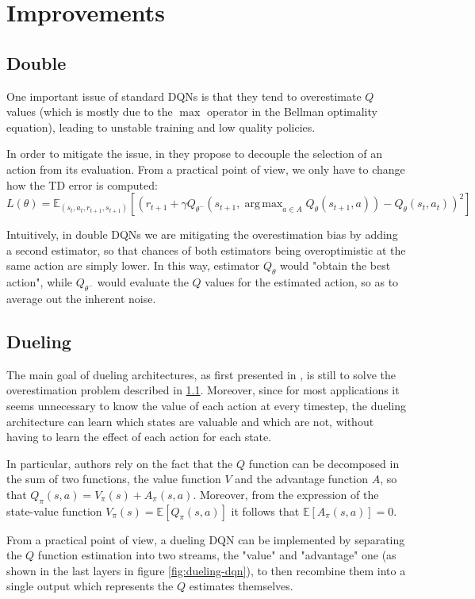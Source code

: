 \documentclass[a4paper,10pt]{report}
\DeclareMathOperator*{\argmax}{arg\,max}
\begin{document}
\section{Improvements}
\subsection{Double}\label{subsec:double-dqn}
One important issue of standard DQNs is that they tend to overestimate $Q$ values (which is mostly due to the $\max$ operator in the Bellman optimality equation), leading to unstable training and low quality policies. 

In order to mitigate the issue, in \cite{double-dqn} they propose to decouple the selection of an action from its evaluation. From a practical point of view, we only have to change how the TD error is computed:
$$
L(\theta)=\mathbb{E}_{(s_t,a_t,r_{t+1},s_{t+1})}\left[\left(r_{t+1}+\gamma Q_{\theta^-}(s_{t+1},\argmax_{a \in A}Q_\theta(s_{t+1},a)) - Q_{\theta}(s_t, a_t)\right)^2\right]
$$

Intuitively, in double DQNs we are mitigating the overestimation bias by adding a second estimator, so that chances of both estimators being overoptimistic at the same action are simply lower. In this way, estimator $Q_{\theta}$ would "obtain the best action", while $Q_{\theta^-}$ would evaluate the $Q$ values for the estimated action, so as to average out the inherent noise.

\subsection{Dueling}\label{subsec:dueling-dqn}
The main goal of dueling architectures, as first presented in \cite{dueling-dqn}, is still to solve the overestimation problem described in \ref{subsec:double-dqn}. Moreover, since for most applications it seems unnecessary to know the value of each action at every timestep, the dueling architecture can learn which states are valuable and which are not, without having to learn the effect of each action for each state.

In particular, authors rely on the fact that the $Q$ function can be decomposed in the sum of two functions, the value function $V$ and the advantage function $A$, so that $Q_\pi(s,a)=V_\pi(s)+A_\pi(s,a)$. Moreover, from the expression of the state-value function $V_\pi(s)=\mathbb{E}\left[Q_\pi\left(s,a\right)\right]$ it follows that $\mathbb{E}\left[A_\pi\left(s,a\right)\right]=0$.

From a practical point of view, a dueling DQN can be implemented by separating the $Q$ function estimation into two streams, the "value" and "advantage" one (as shown in the last layers in figure \ref{fig:dueling-dqn}), to then recombine them into a single output which represents the $Q$ estimates themselves.
\end{document}
